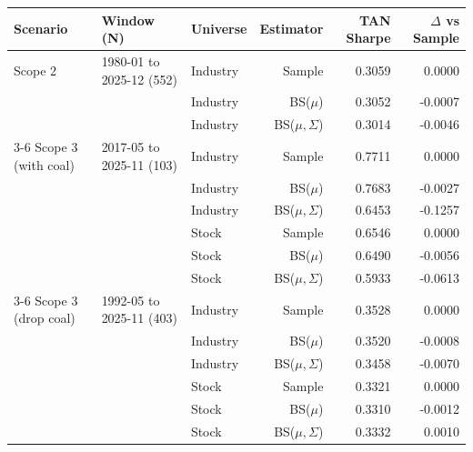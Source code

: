 \begin{tabular}{lllrrr}
\toprule
Scenario & Window (N) & Universe & Estimator & TAN Sharpe & $\Delta$ vs Sample \\
\midrule
\rowcolor{gray!8}
Scope 2 & 1980-01 to 2025-12 (552) & Industry & Sample & 0.3059 & 0.0000 \\
 &  & Industry & BS($\mu$) & 0.3052 & -0.0007 \\
 &  & Industry & BS($\mu,\Sigma$) & 0.3014 & -0.0046 \\
\cmidrule(lr){3-6}
Scope 3 (with coal) & 2017-05 to 2025-11 (103) & Industry & Sample & 0.7711 & 0.0000 \\
 &  & Industry & BS($\mu$) & 0.7683 & -0.0027 \\
 &  & Industry & BS($\mu,\Sigma$) & 0.6453 & -0.1257 \\
 &  & Stock & Sample & 0.6546 & 0.0000 \\
 &  & Stock & BS($\mu$) & 0.6490 & -0.0056 \\
 &  & Stock & BS($\mu,\Sigma$) & 0.5933 & -0.0613 \\
\cmidrule(lr){3-6}
\rowcolor{gray!8}
Scope 3 (drop coal) & 1992-05 to 2025-11 (403) & Industry & Sample & 0.3528 & 0.0000 \\
 &  & Industry & BS($\mu$) & 0.3520 & -0.0008 \\
 &  & Industry & BS($\mu,\Sigma$) & 0.3458 & -0.0070 \\
 &  & Stock & Sample & 0.3321 & 0.0000 \\
 &  & Stock & BS($\mu$) & 0.3310 & -0.0012 \\
 &  & Stock & BS($\mu,\Sigma$) & 0.3332 & 0.0010 \\
\bottomrule
\end{tabular}
